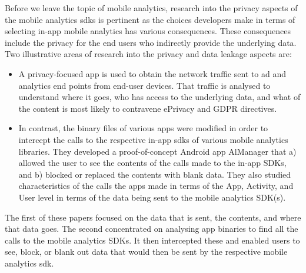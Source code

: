 Before we leave the topic of mobile analytics, research into the privacy aspects of the mobile analytics \Glspl{sdk} is pertinent as the choices developers make in terms of selecting in-app mobile analytics has various consequences. These consequences include the privacy for the end users who indirectly provide the underlying data. Two illustrative areas of research into the privacy and data leakage aspects are:

\begin{itemize}
        \item A privacy-focused app is used to obtain the network traffic sent to ad and analytics end points from end-user devices. That traffic is analysed to understand where it goes, who has access to the underlying data, and what of the content is most likely to contravene ePrivacy and GDPR directives\cite{razaghpanah2018_apps_trackers_privacy_and_regulators_a_global_study_of_the_mobile_tracking_ecosystem}.
        \item In contrast, the binary files of various apps were modified in order to intercept the calls to the respective in-app \Glspl{sdk} of various mobile analytics libraries. They developed a proof-of-concept Android app AlManager that a) allowed the user to see the contents of the calls made to the in-app SDKs, and b) blocked or replaced the contents with blank data. They also studied characteristics of the calls the apps made in terms of the App, Activity, and User level in terms of the data being sent to the mobile analytics SDK(s)\cite{liu2020_privacy_risk_analysis_and_mitigation_of_analytics_libraries_in_the_android_ecosystem}.
\end{itemize}

The first of these papers focused on the data that is sent, the contents, and where that data goes. The second concentrated on analysing app binaries to find all the calls to the mobile analytics SDKs. It then intercepted these and enabled users to see, block, or blank out data that would then be sent by the respective mobile analytics \Gls{sdk}.


